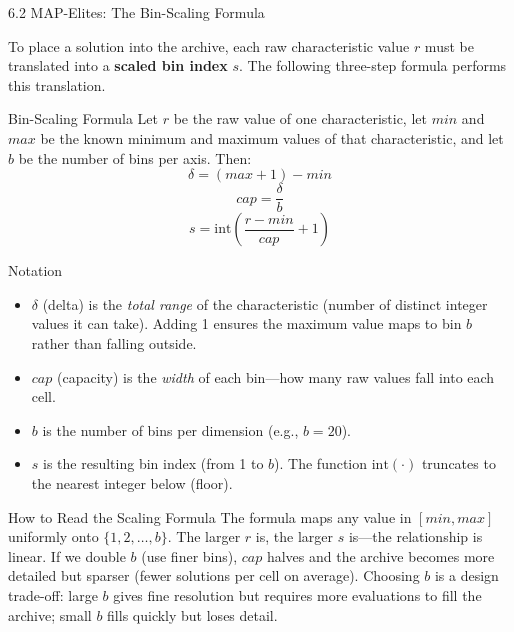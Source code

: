 \documentclass[aspectratio=169,10pt]{beamer}
\begin{document}
\begin{frame}[allowframebreaks]{6.2 MAP-Elites: The Bin-Scaling Formula}

To place a solution into the archive, each raw characteristic value
$r$ must be translated into a \textbf{scaled bin index} $s$.
The following three-step formula performs this translation.

\medskip
\begin{block}{Bin-Scaling Formula}
Let $r$ be the raw value of one characteristic, let $min$ and $max$
be the known minimum and maximum values of that characteristic, and
let $b$ be the number of bins per axis.
Then:
\[
  \delta = (max + 1) - min
\]
\[
  cap = \frac{\delta}{b}
\]
\[
  s = \mathrm{int}\!\left(\frac{r - min}{cap} + 1\right)
\]
\end{block}

\begin{block}{Notation}
\begin{itemize}
  \item $\delta$ (delta) is the \emph{total range} of the
        characteristic (number of distinct integer values it can take).
        Adding 1 ensures the maximum value maps to bin $b$ rather than
        falling outside.
  \item $cap$ (capacity) is the \emph{width} of each bin---how many
        raw values fall into each cell.
  \item $b$ is the number of bins per dimension (e.g., $b=20$).
  \item $s$ is the resulting bin index (from 1 to $b$).
        The function $\mathrm{int}(\cdot)$ truncates to the nearest
        integer below (floor).
\end{itemize}
\end{block}

\framebreak

\begin{alertblock}{How to Read the Scaling Formula}
The formula maps any value in $[min, max]$ uniformly onto $\{1, 2,
\ldots, b\}$.
The larger $r$ is, the larger $s$ is---the relationship is linear.
If we double $b$ (use finer bins), $cap$ halves and the archive becomes
more detailed but sparser (fewer solutions per cell on average).
Choosing $b$ is a design trade-off: large $b$ gives fine resolution
but requires more evaluations to fill the archive; small $b$ fills
quickly but loses detail.
\end{alertblock}


\end{frame}
\end{document}
